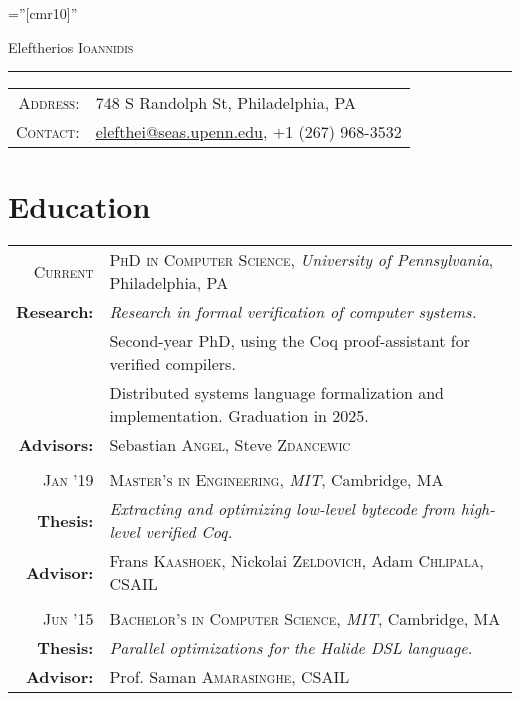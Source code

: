 \documentclass[lettersize,11pt]{article}
\begin{document}
\pagestyle{empty} %
\font\fb=''[cmr10]'' %

\par{\centering
		{\Huge Eleftherios \textsc{Ioannidis}
	}
	\bigskip\par}

\hrule
\begin{tabular}{rl}
    \textsc{Address:}   & 748 S Randolph St, Philadelphia, PA \\
    \textsc{Contact:}   & \href{mailto:elefthei@seas.upenn.edu}{elefthei@seas.upenn.edu}, +1 (267) 968-3532 \\
\end{tabular}

\section{Education}
\begin{tabular}{rl}
\textsc{Current} & \textsc{PhD in Computer Science}, \emph{University of Pennsylvania}, Philadelphia, PA\\
\textbf{Research:} & \emph{Research in formal verification of computer systems.}\\
& Second-year PhD, using the Coq proof-assistant for verified compilers. \\
& Distributed systems language formalization and implementation. Graduation in 2025. \\
\textbf{Advisors:} & Sebastian \textsc{Angel}, Steve \textsc{Zdancewic}\\
& \\
\textsc{Jan} '19 & \textsc{Master's in Engineering}, \emph{MIT}, Cambridge, MA\\
\textbf{Thesis:} & \emph{Extracting and optimizing low-level bytecode from high-level verified Coq.}\\
\textbf{Advisor:} & Frans \textsc{Kaashoek}, Nickolai \textsc{Zeldovich}, Adam \textsc{Chlipala},  CSAIL\\
 & \\
\textsc{Jun} '15 & \textsc{Bachelor's in Computer Science}, \emph{MIT}, Cambridge, MA\\
\textbf{Thesis:} & \emph{Parallel optimizations for the Halide DSL language.}\\
\textbf{Advisor:} & Prof. Saman \textsc{Amarasinghe}, CSAIL\\
\end{tabular}
\end{document}
